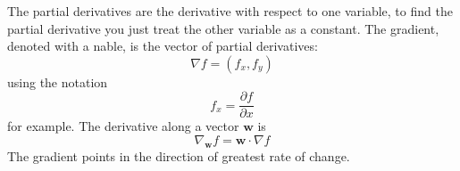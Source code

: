 \documentclass[12pt]{article}
\begin{document}
The partial derivatives are the derivative with respect to one
variable, to find the partial derivative you just treat the other
variable as a constant. The gradient, denoted with a nable, is the
vector of partial derivatives:
\begin{equation}
  \nabla f=(f_x,f_y)
\end{equation}
using the notation
\begin{equation}
  f_x=\frac{\partial f}{\partial x}
\end{equation}
for example. The derivative along a vector $\mathbf{w}$ is
\begin{equation}
  \nabla_{\mathbf{w}}f=\mathbf{w}\cdot \nabla f
\end{equation}
The gradient points in the direction of greatest rate of change.
\end{document}
